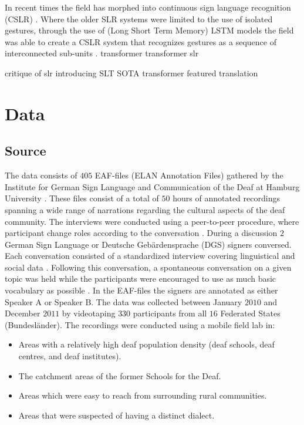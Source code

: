 In recent times the field has morphed into continuous sign language recognition (CSLR) \cite{koller2015continuous}. Where the older SLR systems were limited to the use of isolated gestures, through the use of (Long Short Term Memory) LSTM models \cite{hochreiter1997long} the field was able to create a CSLR system that recognizes gestures as a sequence of interconnected sub-units \cite{mittal2019modified}. 
transformer \cite{vaswani2017attention}
transformer slr \cite{de2020sign}

critique of slr
introducing SLT 
SOTA \cite{camgoz2018neural}
transformer \cite{camgoz2020sign}
featured translation \cite{garcia2016factored}

\section{Data}

\subsection{Source}

The data consists of $405$ EAF-files (ELAN Annotation Files) gathered by the Institute for German Sign Language and Communication of the Deaf at Hamburg University \cite{prillwitz2008dgs}. These files consist of a total of $50$ hours of annotated recordings spanning a wide range of narrations regarding the cultural aspects of the deaf community. The interviews were conducted using a peer-to-peer procedure, where participant change roles according to the conversation \cite{prillwitz2008dgs}. During a discussion $2$ German Sign Language or Deutsche Gebärdensprache (DGS) signers conversed. Each conversation consisted of a standardized interview covering linguistical and social data \cite{deaf_areas}. Following this conversation, a spontaneous conversation on a given topic was held while the participants were encouraged to use as much basic vocabulary as possible \cite{deaf_areas}. In the EAF-files the signers are annotated as either Speaker A or Speaker B. The data was collected between January $2010$ and December $2011$  by videotaping $330$ participants from all $16$ Federated States (Bundesländer). The recordings were conducted using a mobile field lab in:

\begin{itemize}
  \item Areas with a relatively high deaf population density (deaf schools, deaf centres, and deaf institutes). \cite{age_data_hamburg} \cite{deaf_areas}
  \item The catchment areas of the former Schools for the Deaf.\cite{age_data_hamburg} \cite{prillwitz2008dgs}
  \item Areas which were easy to reach from surrounding rural communities. \cite{age_data_hamburg} \cite{deaf_areas}
  \item Areas that were suspected of having a distinct dialect. \cite{age_data_hamburg} \cite{prillwitz2008dgs}
\end{itemize}

